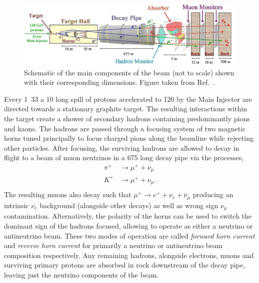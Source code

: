 \begin{figure} %
    \includegraphics[width=\textwidth]{diagrams/4-chips/numi_beam.png}
    \caption[Schematic of the \numi beam.]
    {Schematic of the main components of the \numi beam (not to scale) shown with their
        corresponding dimensions. Figure taken from Ref.~\cite{adamson2016}.}
    \label{fig:numi_beam}
\end{figure}

Every \unit{1.33}{} a \unit{10}{\mu{}} long spill of protons accelerated
to \unit{120}{\GeV} by the Main Injector are directed towards a stationary graphite target. The
resulting interactions within the target create a shower of secondary hadrons containing
predominantly pions and kaons. The hadrons are passed through a focusing system of two magnetic
horns tuned principally to focus charged pions along the beamline while rejecting other particles.
After focusing, the surviving hadrons are allowed to decay in flight to a beam of muon neutrinos
in a \unit{675}{} long decay pipe via the processes,
\begin{align} %
    \pi^{+} & \rightarrow\mu^{+}+\nu_{\mu}  \\
    K^{+}   & \rightarrow\mu^{+}+\nu_{\mu}. \\
    \label{eq:numi_decays}
\end{align}
The resulting muons also decay such that $\mu^{+}\rightarrow e^{+}+\nu_{e}+\bar{\nu}_{\mu}$
producing an intrinsic $\nu_{e}$ background (alongside other decays) as well as wrong sign
$\nu_{\mu}$ contamination. Alternatively, the polarity of the horns can be used to switch the
dominant sign of the hadrons focused, allowing \numi to operate as either a neutrino or
antineutrino beam. These two modes of operation are called \emph{forward horn current} and
\emph{reverse horn current} for primarily a neutrino or antineutrino beam composition
respectively. Any remaining hadrons, alongside electrons, muons and surviving primary protons are
absorbed in rock downstream of the decay pipe, leaving just the neutrino components of the beam.


